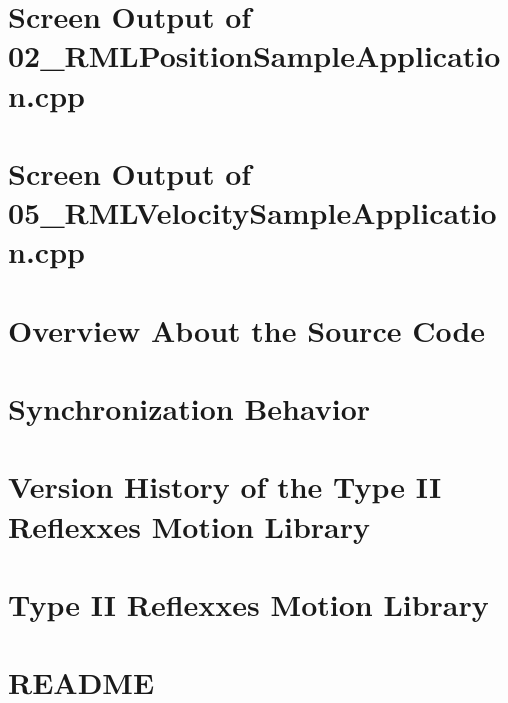 \let\mypdfximage\pdfximage\def\pdfximage{\immediate\mypdfximage}\documentclass[twoside]{book}
\newcommand{\+}{\discretionary{\mbox{\scriptsize$\hookleftarrow$}}{}{}}
\begin{document}
\chapter{Screen Output of 02\+\_\+\+R\+M\+L\+Position\+Sample\+Application.\+cpp}
\label{page_Result_02_RMLPositionSampleApplication}

\chapter{Screen Output of 05\+\_\+\+R\+M\+L\+Velocity\+Sample\+Application.\+cpp}
\label{page_Result_05_RMLVelocitySampleApplication}

\chapter{Overview About the Source Code}
\label{page_SourceCode}

\chapter{Synchronization Behavior}
\label{page_SynchronizationBehavior}

\chapter{Version History of the Type II Reflexxes Motion Library}
\label{page_VersionHistory}

\chapter{Type II Reflexxes Motion Library}
\label{md__home_jonathan_OmniDev_src_omniveyor_hardware_pcv_base_external_ReflexxesTypeII_README}

\chapter{R\+E\+A\+D\+ME}
\label{md__home_jonathan_OmniDev_src_omniveyor_hardware_README}

\end{document}
